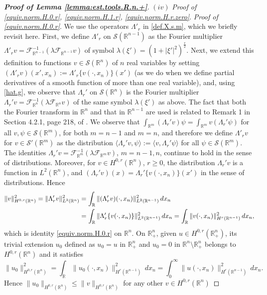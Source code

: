 \documentclass[10pt,reqno,a4paper]{article}
\numberwithin{equation}{section}
\theoremstyle{plain}
\theoremstyle{definition}
\newcommand{\R}{{\mathbb R}}
\newcommand{\mF}{\mathcal{F}}
\newcommand{\mS}{\mathcal{S}}
\newcommand{\lm}{\lambda}
\newcommand{\Lm}{\Lambda}
\newcommand{\la}{\langle}
\newcommand{\ra}{\rangle}
\begin{document}
\begin{proof}[\textbf{Proof of Lemma \ref{lemma:est.tools.R.n.+}}]
$(iv)$ \emph{Proof of \eqref{equiv.norm.H.0.r}, \eqref{equiv.norm.H.1.r}, \eqref{equiv.norm.H.r.zero}}.
\emph{Proof of \eqref{equiv.norm.H.0.r}}.
We use the operators $\Lm'_r$ in \eqref{def.X.s.m}, which we briefly revisit here. 
First, we define $\Lm'_r$ on $\mS(\R^{n-1})$ as the Fourier multiplier 
$\Lm'_r v = \mF_{\R^{n-1}}^{-1} (\lm \mF_{\R^{n-1}} v)$ 
of symbol $\lm(\xi') = (1+|\xi'|^2)^{\frac{r}{2}}$. 
Next, we extend this definition to functions $v \in \mS(\R^n)$ of $n$ real variables by setting 
$(\Lm'_r v)(x',x_n) := \Lm'_r \{ v(\cdot, x_n) \} (x')$ 
(as we do when we define partial derivatives of a smooth function of more than one real variable), 
and, using \eqref{hat.g}, we observe that $\Lm_r'$ on $\mS(\R^n)$ is the Fourier multiplier 
$\Lm_r' v = \mF_{\R^n}^{-1}(\lm \mF_{\R^n} v)$ of the same symbol $\lm(\xi')$ as above. 
The fact that both the Fourier transform in $\R^n$ and that in $\R^{n-1}$ are used 
is related to Remark 1 in Section 4.2.1, page 218, of \cite{Triebel.1983}.  
We observe that $\int_{\R^m} (\Lm_r' v) \psi  
= \int_{\R^m} v (\Lm_r' \psi) $ for all $v, \psi \in \mS(\R^m)$, 
for both $m=n-1$ and $m=n$, 
and therefore we define $\Lm'_r v$ for $v \in \mS'(\R^m)$ as the distribution 
$\la \Lm_r' v, \psi \ra := \la v, \Lm_r' \psi \ra$ for all $\psi \in \mS(\R^m)$.  
The identities $\Lm_r' v = \mF_{\R^m}^{-1}(\lm \mF_{\R^m} v)$, $m=n-1, n$,  
continue to hold in the sense of distributions.
Moreover, for $v \in H^{0,r}(\R^n)$, $r \geq 0$, 
the distribution $\Lm_r' v$ is a function in $L^2(\R^n)$, 
and $(\Lm_r' v)(x) = \Lm_r' \{ v(\cdot, x_n) \} (x')$ 
in the sense of distributions. Hence 
\begin{align}
\| v \|_{H^{0,r}(\R^n)}^2 
= \| \Lambda_r' v \|_{L^2(\R^n)}^2 
& = \int_{\R} \| (\Lambda_r' v)(\cdot , x_n) \|_{L^2(\R^{n-1})}^2 \, dx_n 
\notag \\ 
& = \int_{\R} \| \Lambda_r' \{ v(\cdot , x_n) \} \|_{L^2(\R^{n-1})}^2 \, dx_n 
= \int_\R \| v(\cdot , x_n) \|_{H^r(\R^{n-1})}^2 \, dx_n, 
\label{pinolo.0.r.R.n}
\end{align}
which is identity \eqref{equiv.norm.H.0.r} on $\R^n$. 
On $\R^n_+$, given $u \in H^{0,r}(\R^n_+)$, 
its trivial extension $u_0$ 
defined as $u_0 = u$ in $\R^n_+$ and $u_0 = 0$ in $\R^n \setminus \R^n_+$ 
belongs to $H^{0,r}(\R^n)$ and it satisfies 
\[
\| u_0 \|_{H^{0,r}(\R^n)}^2 
= \int_\R \| u_0(\cdot , x_n) \|_{H^r(\R^{n-1})}^2 \, dx_n 
= \int_0^\infty \| u(\cdot , x_n) \|_{H^r(\R^{n-1})}^2 \, dx_n. 
\]
Hence $\| u_0 \|_{H^{0,r}(\R^n)} \leq \| v \|_{H^{0,r}(\R^n)}$ for any other $v \in H^{0,r}(\R^n)$ 

\end{proof}
\end{document}
